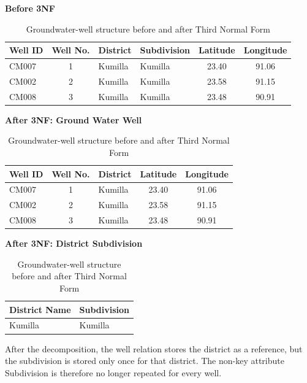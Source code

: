 \begin{table}[htbp]
\centering
\caption{Groundwater-well structure before and after Third Normal Form}
\label{tab:3nf-example}
\small
\renewcommand{\arraystretch}{1.2}

\textbf{Before 3NF}\\[2mm]

\begin{tabular}{@{}lcllcc@{}}
\toprule
\textbf{Well ID} &
\textbf{Well No.} &
\textbf{District} &
\textbf{Subdivision} &
\textbf{Latitude} &
\textbf{Longitude} \\
\midrule
CM007 & 1 & Kumilla & Kumilla & 23.40 & 91.06 \\
CM002 & 2 & Kumilla & Kumilla & 23.58 & 91.15 \\
CM008 & 3 & Kumilla & Kumilla & 23.48 & 90.91 \\
\bottomrule
\end{tabular}

\vspace{5mm}

\textbf{After 3NF: Ground Water Well}\\[2mm]

\begin{tabular}{@{}lclcc@{}}
\toprule
\textbf{Well ID} &
\textbf{Well No.} &
\textbf{District} &
\textbf{Latitude} &
\textbf{Longitude} \\
\midrule
CM007 & 1 & Kumilla & 23.40 & 91.06 \\
CM002 & 2 & Kumilla & 23.58 & 91.15 \\
CM008 & 3 & Kumilla & 23.48 & 90.91 \\
\bottomrule
\end{tabular}

\vspace{5mm}

\textbf{After 3NF: District Subdivision}\\[2mm]

\begin{tabular}{@{}ll@{}}
\toprule
\textbf{District Name} &
\textbf{Subdivision} \\
\midrule
Kumilla & Kumilla \\
\bottomrule
\end{tabular}
\end{table}

After the decomposition, the well relation stores the district as a reference,
but the subdivision is stored only once for that district. The non-key
attribute Subdivision is therefore no longer repeated for every well.

